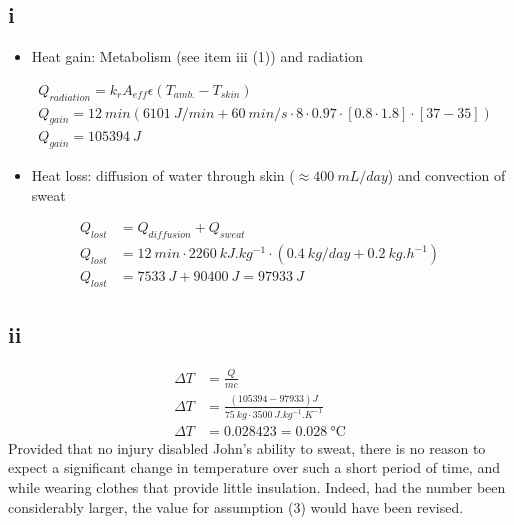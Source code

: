 \subsection*{i}
    \begin{itemize}
        \item Heat gain: Metabolism (see item iii (1)) and radiation
    \end{itemize}
\begin{equation}
    \begin{split}
        &Q_{radiation} = k_r A_{eff} \epsilon \left( T_{amb.} - T_{skin} \right) \\
        &Q_{gain} = \SI{12}{min} \left(
            \SI{6101}{J\per min} + \SI{60}{min\per s} \cdot 8 \cdot 0.97 \cdot [0.8\cdot1.8]\cdot [37-35] 
        \right) \\
        &Q_{gain} = \SI{105394}{J}
    \end{split}
\end{equation}
\begin{itemize}
    \item Heat loss: diffusion of water through skin ($\approx \SI{400}{mL \per day}$) and convection of sweat
\end{itemize}
\begin{equation}\begin{split}
    Q_{lost} &= Q_{diffusion} + Q_{sweat} \\
    Q_{lost} &= \SI{12}{min} \cdot \SI{2260}{kJ.kg^{-1}} \cdot \left(
        \SI{0.4}{kg \per day} +
        \SI{0.2}{kg.h^{-1}}
    \right) \\
    Q_{lost} &= \SI{7533}{J} + \SI{90400}{J} = \SI{97933}{J} 
\end{split}
\end{equation}

\subsection*{ii}
\begin{equation}
    \begin{split}
        \Delta T &= \frac{Q}{mc} \\
        \Delta T &= \frac{(105394-97933) \si{J}}{\SI{75}{kg} \cdot \SI{3500}{J.kg^{-1}.K^{-1}}} \\
        \Delta T &= 0.028423 = \SI{0.028}{\celsius}
    \end{split}
\end{equation}
Provided that no injury disabled John's ability to sweat, there is no reason to expect a significant change in temperature over such a short period of time, and while wearing clothes that provide little insulation. Indeed, had the number been considerably larger, the value for assumption (3) would have been revised.

